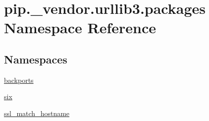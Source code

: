 \hypertarget{namespacepip_1_1__vendor_1_1urllib3_1_1packages}{}\section{pip.\+\_\+vendor.\+urllib3.\+packages Namespace Reference}
\label{namespacepip_1_1__vendor_1_1urllib3_1_1packages}
\subsection*{Namespaces}
\begin{DoxyCompactItemize}
\item 
 \hyperlink{namespacepip_1_1__vendor_1_1urllib3_1_1packages_1_1backports}{backports}
\item 
 \hyperlink{namespacepip_1_1__vendor_1_1urllib3_1_1packages_1_1six}{six}
\item 
 \hyperlink{namespacepip_1_1__vendor_1_1urllib3_1_1packages_1_1ssl__match__hostname}{ssl\+\_\+match\+\_\+hostname}
\end{DoxyCompactItemize}
